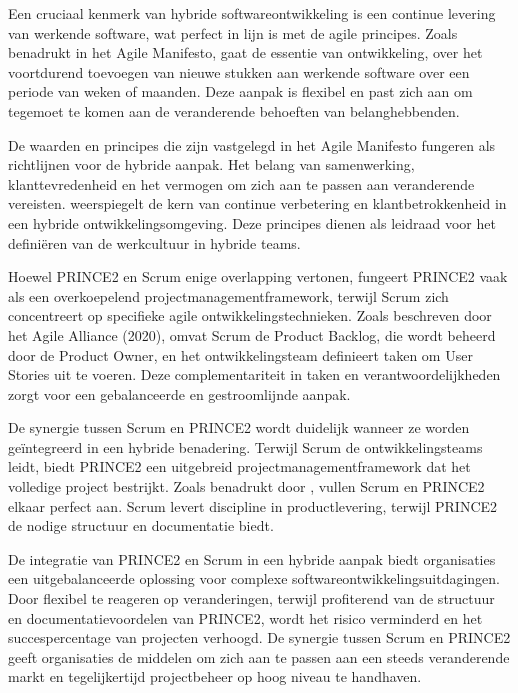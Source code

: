\documentclass[dutch]{hogent-article}
\begin{document}
Een cruciaal kenmerk van hybride softwareontwikkeling is een continue levering van werkende \linebreak software, wat perfect in lijn is met de agile principes. Zoals \textcite{PoniszewskaMaranda2022} \linebreak benadrukt in het Agile Manifesto, gaat de essentie van ontwikkeling, over het voortdurend toevoegen van nieuwe stukken aan werkende software over een periode van weken of maanden. Deze aanpak is flexibel en past zich aan om tegemoet te komen aan de veranderende behoeften van \linebreak belanghebbenden.
\newline

De waarden en principes die zijn vastgelegd in het Agile Manifesto fungeren als richtlijnen voor de hybride aanpak. Het belang van samenwerking, klanttevredenheid en het vermogen om zich aan te passen aan veranderende vereisten. \textcite{Fowler2020} weerspiegelt de kern van continue verbetering en klantbetrokkenheid in een hybride ontwikkelingsomgeving. Deze principes dienen als leidraad voor het definiëren van de werkcultuur in hybride teams.
\newline

Hoewel PRINCE2 en Scrum enige overlapping vertonen, fungeert PRINCE2 vaak als een \linebreak overkoepelend projectmanagementframework, terwijl Scrum zich concentreert op specifieke agile ontwikkelingstechnieken. Zoals beschreven door het Agile Alliance (2020), omvat Scrum de Product Backlog, die wordt beheerd door de Product Owner, en het ontwikkelingsteam definieert taken om User Stories uit te voeren. Deze complementariteit in taken en verantwoordelijkheden zorgt voor een gebalanceerde en gestroomlijnde aanpak.
\newline

De synergie tussen Scrum en PRINCE2 wordt duidelijk wanneer ze worden geïntegreerd in een \linebreak hybride benadering. Terwijl Scrum de ontwikkelingsteams leidt, biedt PRINCE2 een uitgebreid projectmanagementframework dat het volledige project bestrijkt. Zoals benadrukt door \textcite{PoniszewskaMaranda2022}, vullen Scrum en PRINCE2 elkaar perfect aan. Scrum levert discipline in productlevering, terwijl PRINCE2 de nodige structuur en documentatie biedt.
\newline

De integratie van PRINCE2 en Scrum in een hybride aanpak biedt organisaties een uitgebalanceerde oplossing voor complexe softwareontwikkelingsuitdagingen. Door flexibel te reageren op \linebreak veranderingen, terwijl profiterend van de structuur en documentatievoordelen van PRINCE2, wordt het risico verminderd en het succespercentage van projecten verhoogd. De synergie tussen Scrum en PRINCE2 geeft organisaties de middelen om zich aan te passen aan een steeds veranderende markt en tegelijkertijd projectbeheer op hoog niveau te handhaven.
\newline
\end{document}

